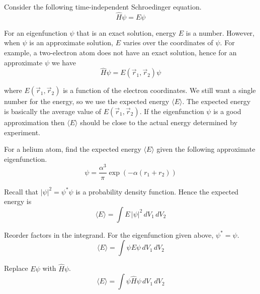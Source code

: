 \documentclass[12pt]{article}
\begin{document}
\noindent
Consider the following time-independent Schroedinger equation.
\begin{equation*}
\hat{H}\psi=E\psi
\end{equation*}

\noindent
For an eigenfunction $\psi$ that is an exact solution, energy $E$ is a number.
However, when $\psi$ is an approximate solution, $E$ varies over the coordinates of $\psi$.
For example, a two-electron atom does not have an exact solution,
hence for an approximate $\psi$ we have
\begin{equation*}
\hat{H}\psi=E(\vec{r}_1,\vec{r}_2)\psi
\end{equation*}

\noindent
where $E(\vec{r}_1,\vec{r}_2)$ is a function of the electron coordinates.
We still want a single number for the energy, so we use the expected energy $\langle E\rangle$.
The expected energy is basically the average value of $E(\vec{r}_1,\vec{r}_2)$.
If the eigenfunction $\psi$ is a good approximation
then $\langle E\rangle$ should be close to the actual energy determined by experiment.

\bigskip
\noindent
For a helium atom, find the expected energy $\langle E\rangle$ given the following approximate eigenfunction.
\begin{equation*}
\psi=\frac{\alpha^3}{\pi}\exp\left(-\alpha (r_1+r_2)\right)
\end{equation*}

\noindent
Recall that $|\psi|^2=\psi^*\psi$ is a probability density function.
Hence the expected energy is
\begin{equation*}
\langle E\rangle=\int E\,|\psi|^2\,dV_1\,dV_2
\end{equation*}

\noindent
Reorder factors in the integrand.
For the eigenfunction given above, $\psi^*=\psi$.
\begin{equation*}
\langle E\rangle=\int\psi E\psi\,dV_1\,dV_2
\end{equation*}

\noindent
Replace $E\psi$ with $\hat{H}\psi$.
\begin{equation*}
\langle E\rangle=\int\psi\hat{H}\psi\,dV_1\,dV_2
\end{equation*}
\end{document}
